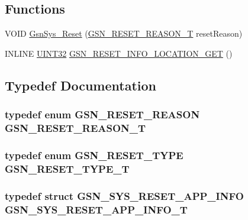 \subsection*{Functions}
\begin{DoxyCompactItemize}
\item 
VOID \hyperlink{a00594_a18f81887d8dcd6f78240cd434ea7152d}{GsnSys\_\-Reset} (\hyperlink{a00594_af75d4e3d8c25ba12e31e4f9c24d5a8f1}{GSN\_\-RESET\_\-REASON\_\-T} resetReason)
\item 
INLINE \hyperlink{a00660_gae1e6edbbc26d6fbc71a90190d0266018}{UINT32} \hyperlink{a00594_a15a0ecf9c4da89af7a4f6b4a89c986aa}{GSN\_\-RESET\_\-INFO\_\-LOCATION\_\-GET} ()
\end{DoxyCompactItemize}


\subsection{Typedef Documentation}
\hypertarget{a00594_af75d4e3d8c25ba12e31e4f9c24d5a8f1}{
\subsubsection[{GSN\_\-RESET\_\-REASON\_\-T}]{\setlength{\rightskip}{0pt plus 5cm}typedef enum {\bf GSN\_\-RESET\_\-REASON} {\bf GSN\_\-RESET\_\-REASON\_\-T}}}
\label{a00594_af75d4e3d8c25ba12e31e4f9c24d5a8f1}
\hypertarget{a00594_a20fcaa965cfca6a82c70751abf38ab32}{
\subsubsection[{GSN\_\-RESET\_\-TYPE\_\-T}]{\setlength{\rightskip}{0pt plus 5cm}typedef enum {\bf GSN\_\-RESET\_\-TYPE}  {\bf GSN\_\-RESET\_\-TYPE\_\-T}}}
\label{a00594_a20fcaa965cfca6a82c70751abf38ab32}
\hypertarget{a00594_aea86e9069b25443b95feb725c7c647a9}{
\subsubsection[{GSN\_\-SYS\_\-RESET\_\-APP\_\-INFO\_\-T}]{\setlength{\rightskip}{0pt plus 5cm}typedef struct {\bf GSN\_\-SYS\_\-RESET\_\-APP\_\-INFO} {\bf GSN\_\-SYS\_\-RESET\_\-APP\_\-INFO\_\-T}}}
